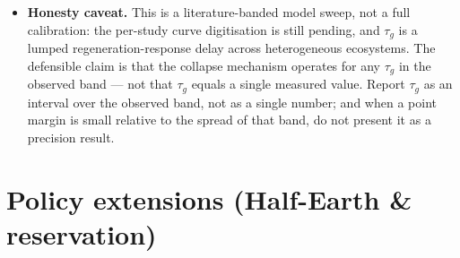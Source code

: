 \documentclass[11pt]{article}
\begin{document}
\begin{itemize}
\item \textbf{Honesty caveat.} This is a literature-banded model sweep, not a full calibration: the per-study curve digitisation is still pending, and $\tau{}_{g}$ is a lumped regeneration-response delay across heterogeneous ecosystems. The defensible claim is that the collapse mechanism operates for any $\tau{}_{g}$ in the observed band — not that $\tau{}_{g}$ equals a single measured value. Report $\tau{}_{g}$ as an interval over the observed band, not as a single number; and when a point margin is small relative to the spread of that band, do not present it as a precision result.
\end{itemize}

\section{Policy extensions (Half-Earth \& reservation)}
\end{document}
